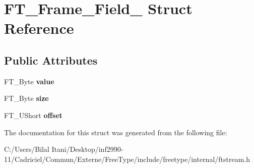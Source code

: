 \hypertarget{struct_f_t___frame___field__}{}\section{F\+T\+\_\+\+Frame\+\_\+\+Field\+\_\+ Struct Reference}
\label{struct_f_t___frame___field__}
\subsection*{Public Attributes}
\begin{DoxyCompactItemize}
\item 
F\+T\+\_\+\+Byte {\bfseries value}\hypertarget{struct_f_t___frame___field___a10f91dcdd0a582727b67ad45d42bab41}{}\label{struct_f_t___frame___field___a10f91dcdd0a582727b67ad45d42bab41}

\item 
F\+T\+\_\+\+Byte {\bfseries size}\hypertarget{struct_f_t___frame___field___a47e6fbcb90c079421d9d9b64f63a587e}{}\label{struct_f_t___frame___field___a47e6fbcb90c079421d9d9b64f63a587e}

\item 
F\+T\+\_\+\+U\+Short {\bfseries offset}\hypertarget{struct_f_t___frame___field___a85c3275fbb7044f7d6880020b6f0f794}{}\label{struct_f_t___frame___field___a85c3275fbb7044f7d6880020b6f0f794}

\end{DoxyCompactItemize}


The documentation for this struct was generated from the following file\+:\begin{DoxyCompactItemize}
\item 
C\+:/\+Users/\+Bilal Itani/\+Desktop/inf2990-\/11/\+Cadriciel/\+Commun/\+Externe/\+Free\+Type/include/freetype/internal/ftstream.\+h\end{DoxyCompactItemize}
